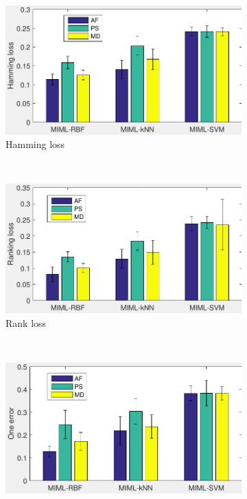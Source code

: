 \begin{figure}[htb!]
\centering

        \begin{subfigure}[b]{0.45\textwidth}
                \includegraphics[width=\textwidth]{image/Ch6/hammingLoss.pdf}
                \caption{Hamming loss}
        \end{subfigure}
       ~
              \begin{subfigure}[b]{0.45\textwidth}
                \includegraphics[width=\textwidth]{image/Ch6/rankingLoss.pdf}
                                \caption{Rank loss}               
        \end{subfigure}  
     \\
              \begin{subfigure}[b]{0.45\textwidth}
                \includegraphics[width=\textwidth]{image/Ch6/oneError.pdf} 

\end{subfigure}
\end{figure}
